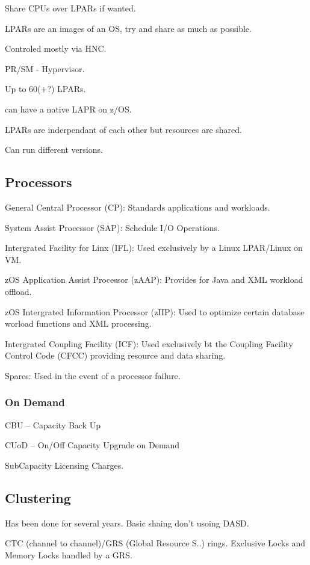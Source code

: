 \documentclass{report}
\begin{document}
Share CPUs over LPARs if wanted.

LPARs are an images of an OS, try and share as much as possible.

Controled mostly via HNC.

PR/SM - Hypervisor.

Up to 60(+?) LPARs.

can have a native LAPR on z/OS.

LPARs are inderpendant of each other but resources are shared.

Can run different versions.

\subsection{Processors}

General Central Processor (CP): Standards applications and workloads.

System Assist Processor (SAP): Schedule I/O Operations.

Intergrated Facility for Linx (IFL): Used exclusively by a Linux LPAR/Linux on VM.

zOS Application Assist Processor (zAAP): Provides for Java and XML workload offload.

zOS Intergrated Information Processor (zIIP): Used to optimize certain database worload functions and XML processing.

Intergrated Coupling Facility (ICF): Used exclusively bt the Coupling Facility Control Code (CFCC) providing resource and data sharing.

Spares: Used in the event of a processor failure.

\subsubsection{On Demand}
CBU -- Capacity Back Up

CUoD -- On/Off Capacity Upgrade on Demand

SubCapacity Licensing Charges.

\subsection{Clustering}

Has been done for several years. Basic shaing don't usoing DASD.

CTC (channel to channel)/GRS (Global Resource S..) rings. Exclusive Locks and Memory Locks handled by a GRS.
\end{document}
